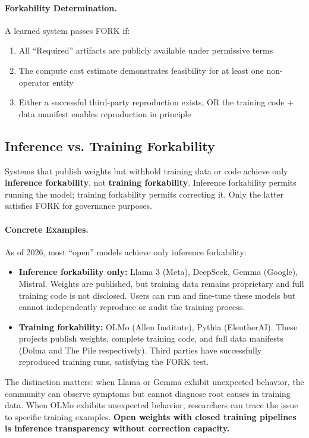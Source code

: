 \documentclass[11pt,a4paper]{article}
\theoremstyle{definition}
\begin{document}
\paragraph{Forkability Determination.} A learned system passes FORK if:
\begin{enumerate}[noitemsep]
    \item All ``Required'' artifacts are publicly available under permissive terms
    \item The compute cost estimate demonstrates feasibility for at least one non-operator entity
    \item Either a successful third-party reproduction exists, OR the training code + data manifest enables reproduction in principle
\end{enumerate}

\subsection{Inference vs. Training Forkability}

Systems that publish weights but withhold training data or code achieve only \textbf{inference forkability}, not \textbf{training forkability}. Inference forkability permits running the model; training forkability permits correcting it. Only the latter satisfies FORK for governance purposes.

\paragraph{Concrete Examples.} As of 2026, most ``open'' models achieve only inference forkability:
\begin{itemize}[noitemsep]
    \item \textbf{Inference forkability only:} Llama 3 (Meta), DeepSeek, Gemma (Google), Mistral. Weights are published, but training data remains proprietary and full training code is not disclosed. Users can run and fine-tune these models but cannot independently reproduce or audit the training process.
    \item \textbf{Training forkability:} OLMo (Allen Institute), Pythia (EleutherAI). These projects publish weights, complete training code, and full data manifests (Dolma and The Pile respectively). Third parties have successfully reproduced training runs, satisfying the FORK test.
\end{itemize}

The distinction matters: when Llama or Gemma exhibit unexpected behavior, the community can observe symptoms but cannot diagnose root causes in training data. When OLMo exhibits unexpected behavior, researchers can trace the issue to specific training examples. \textbf{Open weights with closed training pipelines is inference transparency without correction capacity.}
\end{document}
